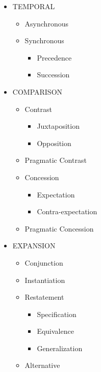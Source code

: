 \documentclass[xcolor=table]{beamer}
\begin{document}
\begin{frame}
\begin{figure}
\begin{tcolorbox}[colback=white, colframe=blue, boxrule=1pt, text width=.9\textwidth]
\begin{minipage}{.3\textwidth}
\begin{itemize}
				\item TEMPORAL
				\begin{itemize}\tiny\bfseries
					\item Asynchronous
					\item Synchronous
					\begin{itemize}\tiny\bfseries
						\item Precedence
						\item Succession
					\end{itemize}
				\end{itemize}
				\item COMPARISON
				\begin{itemize}\tiny\bfseries
					\item Contrast
					\begin{itemize}\tiny\bfseries
						\item Juxtaposition 
						\item Opposition
					\end{itemize}
					\item Pragmatic Contrast
					\item Concession
					\begin{itemize}\tiny\bfseries
						\item Expectation
						\item Contra-expectation
					\end{itemize}
					\item Pragmatic Concession
				\end{itemize}
			\end{itemize}
		\end{minipage}
		\begin{minipage}{.3\textwidth}
			\tiny\bfseries
			\begin{itemize}\tiny\bfseries
				\item EXPANSION
				\begin{itemize}\tiny\bfseries
					\item Conjunction
					\item Instantiation
					\item Restatement
					\begin{itemize}\tiny\bfseries
						\item Specification
						\item Equivalence
						\item Generalization
					\end{itemize}
					\item Alternative
					\begin{itemize}\tiny\bfseries

\end{itemize}
\end{itemize}
\end{itemize}
\end{minipage}
\end{tcolorbox}
\end{figure}
\end{frame}
\end{document}
